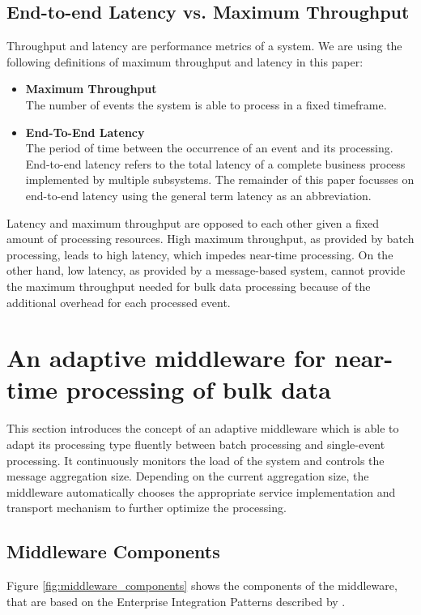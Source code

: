 \subsection{End-to-end Latency vs. Maximum Throughput}\label{sec:latency_throughput}
Throughput and latency are performance metrics of a system. We are using the following definitions of maximum throughput and latency in this paper:
\begin{itemize}
	\item \textbf{Maximum Throughput}\\
	The number of events the system is able to process in a fixed timeframe.
 	\item \textbf{End-To-End Latency}\\
	The period of time between the occurrence of an event and its processing. End-to-end latency refers to the total latency of a complete business process implemented by multiple subsystems. The remainder of this paper focusses on end-to-end latency using the general term latency as an abbreviation.
\end{itemize}

Latency and maximum throughput are opposed to each other given a fixed amount of processing resources. High maximum throughput, as provided by batch processing, leads to high latency, which impedes near-time processing. On the other hand, low latency, as provided by a message-based system, cannot provide the maximum throughput needed for bulk data processing because of the additional overhead for each processed event.

\section{An adaptive middleware for near-time processing of bulk data}\label{sec:adaptive_middleware}
This section introduces the concept of an adaptive middleware which is able to adapt its processing type fluently between batch processing and single-event processing. It continuously monitors the load of the system and controls the message aggregation size. Depending on the current aggregation size, the middleware automatically chooses the appropriate service implementation and transport mechanism to further optimize the processing.
\subsection{Middleware Components}
Figure \ref{fig:middleware_components} shows the components of the middleware, that are based on the Enterprise Integration Patterns described by \cite{Hohpe:2003fk}.


